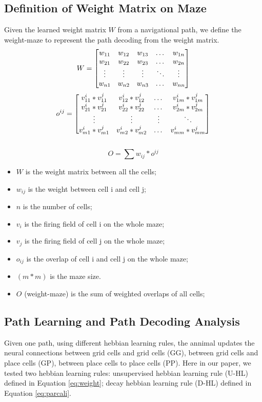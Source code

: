 \documentclass[11pt, letterpaper, onecolumn]{article}
\begin{document}
\subsection{Definition of Weight Matrix on Maze}
Given the learned weight matrix $W$ from a navigational path, we define the weight-maze to represent the path decoding from the weight matrix.
\[
    W \\
    = 
\begin{bmatrix}
    w_{11}       & w_{12} & w_{13} & \dots & w_{1n} \\
    w_{21}       & w_{22} & w_{23} & \dots & w_{2n} \\
    \vdots & \vdots & \vdots & \ddots & \vdots \\
    w_{n1}       & w_{n2} & w_{n3} & \dots & w_{nn} \\
\end{bmatrix}
\] 
\[
    o^{ij} \\
    = 
\begin{bmatrix}
    v^{i}_{11}*v^{j}_{11} & v^{i}_{12}*v^{j}_{12} & \dots  & v^{i}_{1m}*v^{j}_{1m} \\
    v^{i}_{21}*v^{j}_{21} & v^{i}_{22}*v^{j}_{22} & \dots  & v^{i}_{2m}*v^{j}_{2m} \\
    \vdots & \vdots & \vdots & \ddots \\
    v^{i}_{m1}*v^{j}_{m1} & v^{i}_{m2}*v^{j}_{m2} & \dots  & v^{i}_{mm}*v^{j}_{mm} \\
\end{bmatrix}
\] \\
\[
    O = \sum {w_{ij}*o^{ij}}
\]
\begin{itemize}
    \item $W$ is the weight matrix between all the cells;
    \item $w_{ij}$ is the weight between cell i and cell j;
    \item $n$ is the number of cells;
    \item $v_{i}$ is the firing field of cell i on the whole maze;
    \item $v_{j}$ is the firing field of cell j on the whole maze;
    \item $o_{ij}$ is the overlap of cell i and cell j on the whole maze;
    \item $(m*m)$ is the maze size.
    \item $O$ (weight-maze) is the sum of weighted overlaps of all cells;
\end{itemize}


\subsection{Path Learning and Path Decoding Analysis}
Given one path, using different hebbian learning rules, the annimal updates the neural connections between grid cells and grid cells (GG), between grid cells and place cells (GP), between place cells to place cells (PP). Here in our paper, we tested two hebbian learning rules: unsupervised hebbian learning rule (U-HL) defined in Equation \ref{eq:weight}; decay hebbian learning rule (D-HL) defined in Equation \ref{eq:parcali}.
\end{document}
